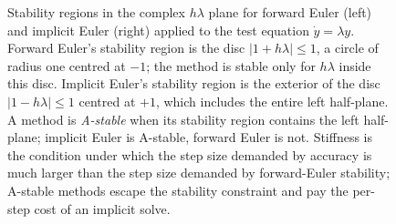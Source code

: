 \begin{figure}[htbp]
\begin{tikzpicture}
\end{tikzpicture}
\caption[Stability regions for forward and implicit
Euler]{Stability regions in the complex $h\lambda$ plane for
forward Euler (left) and implicit Euler (right) applied to the
test equation $\dot{y}=\lambda y$. Forward Euler's stability
region is the disc $|1+h\lambda|\leq 1$, a circle of radius one
centred at $-1$; the method is stable only for $h\lambda$ inside
this disc. Implicit Euler's stability region is the exterior of
the disc $|1-h\lambda|\leq 1$ centred at $+1$, which includes the
entire left half-plane. A method is \emph{A-stable} when its
stability region contains the left half-plane; implicit Euler is
A-stable, forward Euler is not. Stiffness is the condition under
which the step size demanded by accuracy is much larger than the
step size demanded by forward-Euler stability; A-stable methods
escape the stability constraint and pay the per-step cost of an
implicit solve.}
\label{fig:vol02:ch07:stiffness}
\end{figure}
